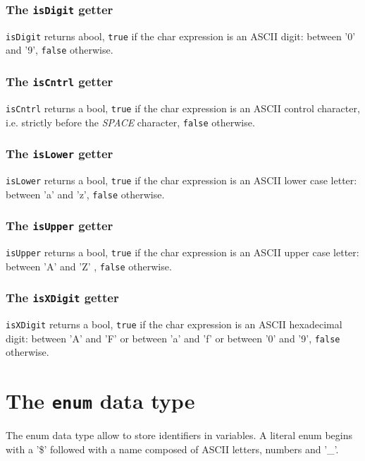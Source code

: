 \documentclass[10pt,openright,twosides]{report}
\newcommand{\gtltype}[1]{{\small\ttfamily #1}}
\newcommand{\ccst}[1]{{\footnotesize\ttfamily\colorbox{light-blue}{'#1'}}}
\newcommand{\gtlinline}[1]{\colorbox{light-blue}{\lstinline[language=gtl]{#1}}}
\begin{document}
\subsubsection{The \texttt{isDigit} getter}

\gtlinline{isDigit} returns abool, \gtlinline{true} if the char expression is an ASCII digit: between \ccst{0} and \ccst{9}, \gtlinline{false} otherwise.

\subsubsection{The \texttt{isCntrl} getter}

\gtlinline{isCntrl} returns a bool, \gtlinline{true} if the char expression is an ASCII control character, i.e. strictly before the {\em SPACE} character, \gtlinline{false} otherwise.

\subsubsection{The \texttt{isLower} getter}

\gtlinline{isLower} returns a bool, \gtlinline{true} if the char expression is an ASCII lower case letter: between \ccst{a} and \ccst{z}, \gtlinline{false} otherwise.

\subsubsection{The \texttt{isUpper} getter}

\gtlinline{isUpper} returns a bool, \gtlinline{true} if the char expression is an ASCII upper case letter: between \ccst{A} and \ccst{Z} , \gtlinline{false} otherwise.

\subsubsection{The \texttt{isXDigit} getter}

\gtlinline{isXDigit} returns a bool, \texttt{true} if the char expression is an ASCII hexadecimal digit: between \ccst{A} and \ccst{F} or between \ccst{a} and \ccst{f} or between \ccst{0} and \ccst{9}, \texttt{false} otherwise.
  
\section{The \texttt{enum} data type}

The \gtltype{enum} data type allow to store identifiers in variables. A literal enum begins with a \ccst{\$} followed with a name composed of ASCII letters, numbers and \ccst{\_}.
\end{document}
